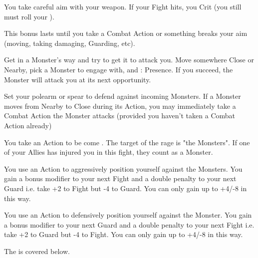 {  
  
  You take careful aim with your weapon.  If your  Fight \RO hits, you Crit (you still must roll your \FOC).

  This bonus lasts until you take a Combat Action or something breaks your aim (moving, taking damaging, Guarding, etc).

  Get in a Monster's way and try to get it to attack you.  Move somewhere Close or Nearby, pick a Monster to engage with, and \RS : Presence.  If you succeed, the Monster will attack you at its next opportunity.

  Set your polearm or spear to defend against incoming Monsters.  If a Monster moves from Nearby to Close during its Action, you may immediately take a Combat Action  the Monster attacks (provided you haven't taken a Combat Action already)

  You take an Action to be come .  The target of the rage is "the Monsters". If one of your Allies has injured you in this fight, they count as a Monster.

  You use an Action to aggressively position yourself against the Monsters.  You gain a bonus modifier to your next Fight \RO and a double penalty to your next Guard \RO i.e. take +2 to Fight but -4 to Guard.  You can only gain up to +4/-8 in this way.


  You use an Action to defensively position yourself against the Monster.  You gain a bonus modifier to your next Guard \RO and a double penalty to your next Fight \RO i.e. take +2 to Guard but -4 to Fight. You can only gain up to +4/-8 in this way.



  The  is covered below.



}
